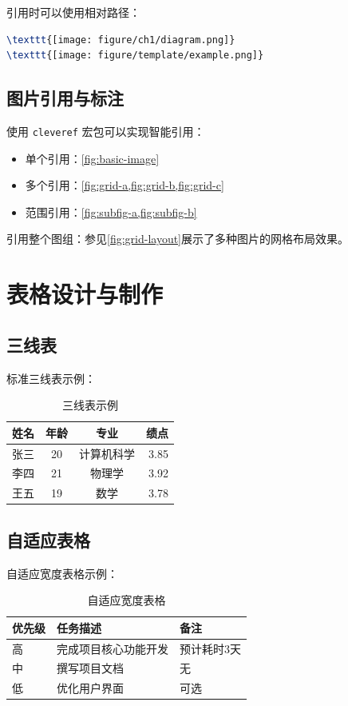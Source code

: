 \documentclass[../main]{subfiles}
\begin{document}
引用时可以使用相对路径：
\begin{lstlisting}[language=TeX, basicstyle=\ttfamily\small]
\texttt{[image: figure/ch1/diagram.png]}
\texttt{[image: figure/template/example.png]}
\end{lstlisting}

\subsection{图片引用与标注}
使用 \texttt{cleveref} 宏包可以实现智能引用：
\begin{itemize}
    \item 单个引用：\cref{fig:basic-image}
    \item 多个引用：\cref{fig:grid-a,fig:grid-b,fig:grid-c}
    \item 范围引用：\cref{fig:subfig-a,fig:subfig-b}
\end{itemize}

引用整个图组：参见\cref{fig:grid-layout}展示了多种图片的网格布局效果。

\section{表格设计与制作}

\subsection{三线表}
标准三线表示例：
\begin{table}[H]
    \centering
    \caption{三线表示例}
    \label{tab:booktabs}
    \begin{tabular}{lccr}
        \toprule
        姓名 & 年龄 & 专业 & 绩点 \\
        \midrule
        张三 & 20 & 计算机科学 & 3.85 \\
        李四 & 21 & 物理学 & 3.92 \\
        王五 & 19 & 数学 & 3.78 \\
        \bottomrule
    \end{tabular}
\end{table}

\subsection{自适应表格}
自适应宽度表格示例：
\begin{table}[H]
    \centering
    \caption{自适应宽度表格}
    \label{tab:tabularx}
    \begin{tabularx}{\tablewidth}{|l|X|X|}
        \hline
        \textbf{优先级} & \textbf{任务描述} & \textbf{备注} \\
        \hline
        高 & 完成项目核心功能开发 & 预计耗时3天 \\
        \hline
        中 & 撰写项目文档 & 无 \\
        \hline
        低 & 优化用户界面 & 可选 \\
        \hline
    \end{tabularx}
\end{table}
\end{document}
